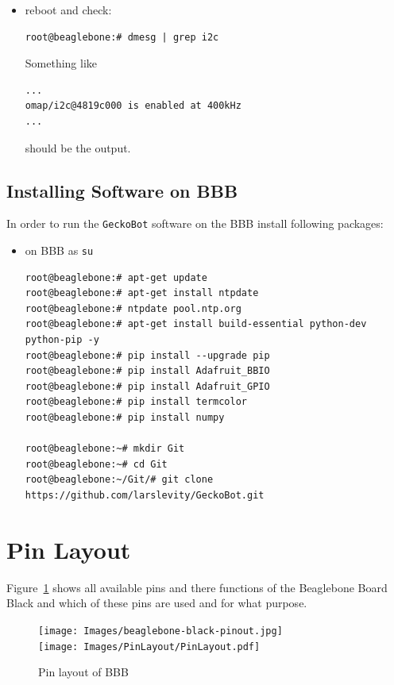 \documentclass[
	fontsize=10pt
	paper=a4
]{scrartcl}
\begin{document}
\begin{itemize}
\item reboot and check:
\begin{lstlisting}
root@beaglebone:# dmesg | grep i2c
\end{lstlisting}
Something like
\begin{lstlisting}
... 
omap/i2c@4819c000 is enabled at 400kHz
...
\end{lstlisting}
should be the output.


\end{itemize}















\subsection{Installing Software on BBB}
In order to run the \texttt{GeckoBot} software on the BBB install following packages:
\begin{itemize}
\item on BBB as \texttt{su}
\begin{lstlisting}
root@beaglebone:# apt-get update
root@beaglebone:# apt-get install ntpdate
root@beaglebone:# ntpdate pool.ntp.org
root@beaglebone:# apt-get install build-essential python-dev python-pip -y
root@beaglebone:# pip install --upgrade pip
root@beaglebone:# pip install Adafruit_BBIO
root@beaglebone:# pip install Adafruit_GPIO
root@beaglebone:# pip install termcolor
root@beaglebone:# pip install numpy

root@beaglebone:~# mkdir Git
root@beaglebone:~# cd Git
root@beaglebone:~/Git/# git clone https://github.com/larslevity/GeckoBot.git

\end{lstlisting}
\end{itemize}








\clearpage

\section{Pin Layout}

Figure~\ref{fig:BBBpins} shows all available pins and there functions of the Beaglebone Board Black and which of these pins are used and for what purpose.
\begin{figure}[h!]
\begin{center}
\texttt{[image: Images/beaglebone-black-pinout.jpg]} \\
\texttt{[image: Images/PinLayout/PinLayout.pdf]}
\caption{Pin layout of BBB}
\label{fig:BBBpins}
\end{center}
\end{figure}
\end{document}
